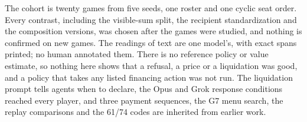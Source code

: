 \documentclass[11pt,letterpaper]{article}
\begin{document}
The cohort is twenty games from five seeds, one roster and one cyclic seat order. Every contrast, including the visible-sum split, the recipient standardization and the composition versions, was chosen after the games were studied, and nothing is confirmed on new games. The readings of text are one model's, with exact spans printed; no human annotated them. There is no reference policy or value estimate, so nothing here shows that a refusal, a price or a liquidation was good, and a policy that takes any listed financing action was not run. The liquidation prompt tells agents when to declare, the Opus and Grok response conditions reached every player, and three payment sequences, the G7 menu search, the replay comparisons and the 61/74 codes are inherited from earlier work.



\end{document}
